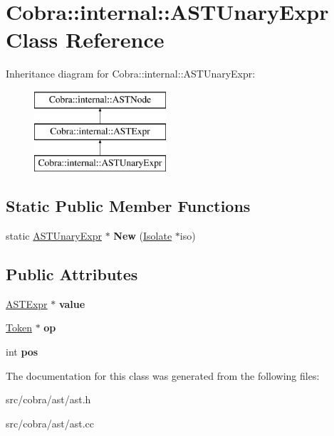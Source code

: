 \hypertarget{class_cobra_1_1internal_1_1_a_s_t_unary_expr}{\section{Cobra\+:\+:internal\+:\+:A\+S\+T\+Unary\+Expr Class Reference}
\label{class_cobra_1_1internal_1_1_a_s_t_unary_expr}
}
Inheritance diagram for Cobra\+:\+:internal\+:\+:A\+S\+T\+Unary\+Expr\+:\begin{figure}[H]
\begin{center}
\leavevmode
\includegraphics[height=3.000000cm]{class_cobra_1_1internal_1_1_a_s_t_unary_expr}
\end{center}
\end{figure}
\subsection*{Static Public Member Functions}
\begin{DoxyCompactItemize}
\item 
\hypertarget{class_cobra_1_1internal_1_1_a_s_t_unary_expr_a51054d2f0194a0e24ff0e54399c47c93}{static \hyperlink{class_cobra_1_1internal_1_1_a_s_t_unary_expr}{A\+S\+T\+Unary\+Expr} $\ast$ {\bfseries New} (\hyperlink{class_cobra_1_1internal_1_1_isolate}{Isolate} $\ast$iso)}\label{class_cobra_1_1internal_1_1_a_s_t_unary_expr_a51054d2f0194a0e24ff0e54399c47c93}

\end{DoxyCompactItemize}
\subsection*{Public Attributes}
\begin{DoxyCompactItemize}
\item 
\hypertarget{class_cobra_1_1internal_1_1_a_s_t_unary_expr_a42f025f4ad5154da2e8443c93b4503b6}{\hyperlink{class_cobra_1_1internal_1_1_a_s_t_expr}{A\+S\+T\+Expr} $\ast$ {\bfseries value}}\label{class_cobra_1_1internal_1_1_a_s_t_unary_expr_a42f025f4ad5154da2e8443c93b4503b6}

\item 
\hypertarget{class_cobra_1_1internal_1_1_a_s_t_unary_expr_aa284a1dd2bb9b1d09242957f322fa780}{\hyperlink{class_cobra_1_1internal_1_1_token}{Token} $\ast$ {\bfseries op}}\label{class_cobra_1_1internal_1_1_a_s_t_unary_expr_aa284a1dd2bb9b1d09242957f322fa780}

\item 
\hypertarget{class_cobra_1_1internal_1_1_a_s_t_unary_expr_aa7e66ada18fdc5b342f7b051261fde5c}{int {\bfseries pos}}\label{class_cobra_1_1internal_1_1_a_s_t_unary_expr_aa7e66ada18fdc5b342f7b051261fde5c}

\end{DoxyCompactItemize}


The documentation for this class was generated from the following files\+:\begin{DoxyCompactItemize}
\item 
src/cobra/ast/ast.\+h\item 
src/cobra/ast/ast.\+cc\end{DoxyCompactItemize}
